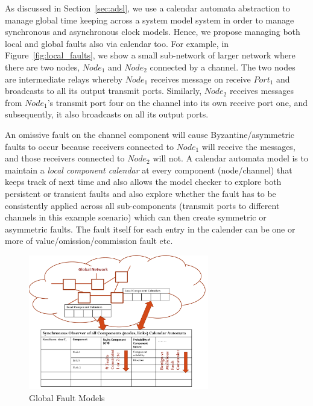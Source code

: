 As discussed in Section~\ref{sec:adsl}, we use a calendar
automata abstraction to manage global time keeping across a system model system
in order to manage synchronous and asynchronous clock models. Hence, we propose
managing both local and global faults also via calendar too. For example, in
Figure~\ref{fig:local_faults}, we show a small sub-network of larger network
where there are two nodes, $Node_1$ and $Node_2$ connected by a channel. The two
nodes are intermediate relays whereby $Node_1$ receives message on receive
$Port_1$ and broadcasts to all its output transmit ports. Similarly, $Node_2$
receives messages from $Node_1$'s transmit port four on the channel into its own
receive port one, and subsequently, it also broadcasts on all its output
ports.

An omissive fault on the channel component will cause
Byzantine/asymmetric faults to occur because receivers connected to $Node_1$ will
receive the messages, and those receivers connected to $Node_2$ will not.  A
calendar automata model is to maintain a \emph{local component calendar} at every component
(node/channel) that keeps track of next time and also allows the model checker
to explore both persistent or transient faults and also explore whether the
fault has to be consistently applied across all sub-components (transmit ports to
different channels in this example scenario) which can then create symmetric or
asymmetric faults. The fault itself for each entry in the calender can be one or
more of value/omission/commission fault etc.

\begin{figure}
\begin{center}
\includegraphics[width=0.7\textwidth]{figures/global_faults.pdf}
\caption{Global Fault Models}
\label{fig:global_faults}
\end{center}
\end{figure}

